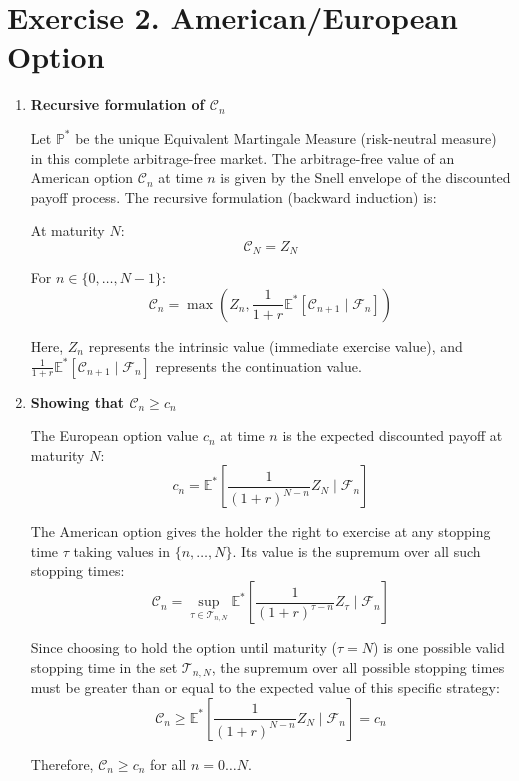 \section{Exercise 2. American/European Option}

\begin{enumerate}
      \item \textbf{Recursive formulation of $\mathcal{C}_n$}

            Let $\mathbb{P}^*$ be the unique Equivalent Martingale Measure (risk-neutral measure) in this complete arbitrage-free market.
            The arbitrage-free value of an American option $\mathcal{C}_n$ at time $n$ is given by the Snell envelope of the discounted payoff process. The recursive formulation (backward induction) is:

            At maturity $N$:
            \[ \mathcal{C}_N = Z_N \]

            For $n \in \{0, \dots, N-1\}$:
            \[ \mathcal{C}_n = \max\left(Z_n, \frac{1}{1+r} \mathbb{E}^*\left[\mathcal{C}_{n+1} \mid \mathcal{F}_n\right]\right) \]

            Here, $Z_n$ represents the intrinsic value (immediate exercise value), and $\frac{1}{1+r} \mathbb{E}^*[\mathcal{C}_{n+1} \mid \mathcal{F}_n]$ represents the continuation value.

      \item \textbf{Showing that $\mathcal{C}_n \ge c_n$}

            The European option value $c_n$ at time $n$ is the expected discounted payoff at maturity $N$:
            \[ c_n = \mathbb{E}^*\left[\frac{1}{(1+r)^{N-n}} Z_N \mid \mathcal{F}_n\right] \]

            The American option gives the holder the right to exercise at any stopping time $\tau$ taking values in $\{n, \dots, N\}$. Its value is the supremum over all such stopping times:
            \[ \mathcal{C}_n = \sup_{\tau \in \mathcal{T}_{n, N}} \mathbb{E}^*\left[\frac{1}{(1+r)^{\tau-n}} Z_\tau \mid \mathcal{F}_n\right] \]

            Since choosing to hold the option until maturity ($\tau = N$) is one possible valid stopping time in the set $\mathcal{T}_{n, N}$, the supremum over all possible stopping times must be greater than or equal to the expected value of this specific strategy:
            \[ \mathcal{C}_n \ge \mathbb{E}^*\left[\frac{1}{(1+r)^{N-n}} Z_N \mid \mathcal{F}_n\right] = c_n \]

            Therefore, $\mathcal{C}_n \ge c_n$ for all $n = 0 \dots N$.


\end{enumerate}
